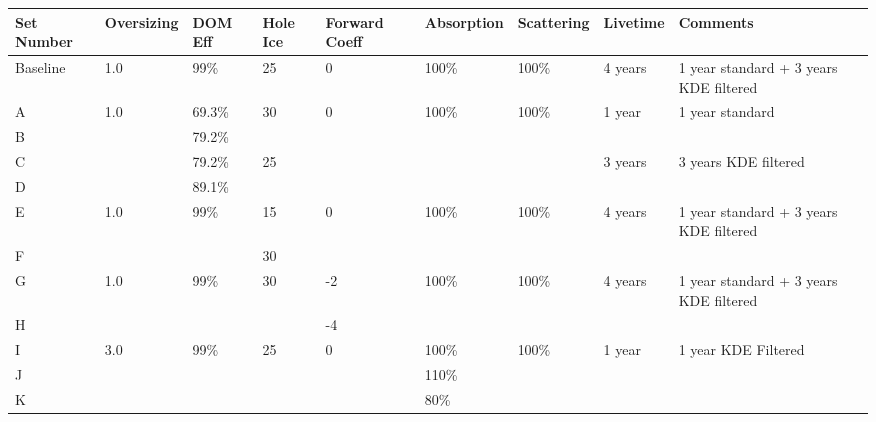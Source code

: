 \begin{landscape}
\begin{table}[]
\centering
\begin{tabular}{@{}lllllllll@{}}
\toprule
Set Number & Oversizing & DOM Eff & Hole Ice & Forward Coeff & Absorption & Scattering & Livetime & Comments                               \\ \midrule
Baseline   & 1.0        & 99\%    & 25       & 0             & 100\%      & 100\%      & 4 years  & 1 year standard + 3 years KDE filtered \\ \midrule
A          & 1.0        & 69.3\%  & 30       & 0             & 100\%      & 100\%      & 1 year   & 1 year standard                        \\
B          &            & 79.2\%  &          &               &            &            &          &                                        \\
C          &            & 79.2\%  & 25       &               &            &            & 3 years  & 3 years KDE filtered                   \\
D          &            & 89.1\%  &           &               &            &            &          &                                        \\ \midrule
E          & 1.0        & 99\%    & 15       & 0             & 100\%      & 100\%      & 4 years  & 1 year standard + 3 years KDE filtered \\
F          &            &         & 30       &               &            &            &          &                                        \\ \midrule
G          & 1.0        & 99\%    & 30       & -2            & 100\%      & 100\%      & 4 years  & 1 year standard + 3 years KDE filtered \\
H          &            &         &          & -4            &            &            &          &                                        \\ \midrule
I          & 3.0        & 99\%    & 25       & 0             & 100\%      & 100\%      & 1 year   & 1 year KDE Filtered    \\
J          &            &         &          &               & 110\%      &                 &          &                                        \\
K          &            &         &          &               & 80\%       &                  &          &                                        \\

\end{tabular}
\end{table}
\end{landscape}
